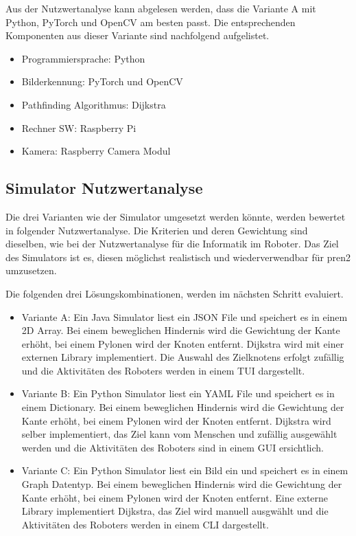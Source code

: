 Aus der Nutzwertanalyse kann abgelesen werden, dass die Variante A mit Python, PyTorch und OpenCV am besten passt. Die entsprechenden Komponenten aus dieser Variante sind nachfolgend aufgelistet.

\begin{itemize}
    \item Programmiersprache: Python
    \item Bilderkennung: PyTorch und OpenCV
    \item Pathfinding Algorithmus: Dijkstra
    \item Rechner SW: Raspberry Pi
    \item Kamera: Raspberry Camera Modul
\end{itemize}

\subsection{Simulator Nutzwertanalyse}

Die drei Varianten wie der Simulator umgesetzt werden könnte, werden bewertet in folgender Nutzwertanalyse. Die Kriterien und deren Gewichtung sind dieselben, wie bei der Nutzwertanalyse für die Informatik im Roboter. Das Ziel des Simulators ist es, diesen möglichst realistisch und wiederverwendbar für \acrshort{pren2} umzusetzen.


Die folgenden drei Lösungskombinationen, werden im nächsten Schritt evaluiert.

\begin{itemize}
    \item Variante A: Ein Java Simulator liest ein JSON File und speichert es in einem 2D Array. Bei einem beweglichen Hindernis wird die Gewichtung der Kante erhöht, bei einem Pylonen wird der Knoten entfernt. Dijkstra wird mit einer externen Library implementiert. Die Auswahl des Zielknotens erfolgt zufällig und die Aktivitäten des Roboters werden in einem TUI dargestellt.
    \item Variante B: Ein Python Simulator liest ein YAML File und speichert es in einem Dictionary. Bei einem beweglichen Hindernis wird die Gewichtung der Kante erhöht, bei einem Pylonen wird der Knoten entfernt. Dijkstra wird selber implementiert, das Ziel kann vom Menschen und zufällig ausgewählt werden und die Aktivitäten des Roboters sind in einem GUI ersichtlich.
    \item Variante C: Ein Python Simulator liest ein Bild ein und speichert es in einem Graph Datentyp. Bei einem beweglichen Hindernis wird die Gewichtung der Kante erhöht, bei einem Pylonen wird der Knoten entfernt. Eine externe Library implementiert Dijkstra, das Ziel wird manuell ausgwählt und die Aktivitäten des Roboters werden in einem CLI dargestellt.
\end{itemize}


